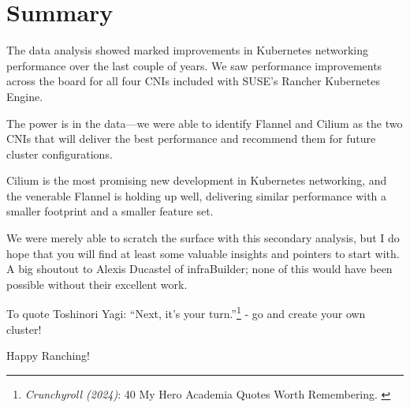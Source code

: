 %
%

\pagebreak
\section{Summary}

\onehalfspacing

The data analysis showed marked improvements in Kubernetes networking performance over the last couple of years. We saw performance improvements across the board for all four CNIs included with SUSE's Rancher Kubernetes Engine.

The power is in the data—we were able to identify Flannel and Cilium as the two CNIs that will deliver the best performance and recommend them for future cluster configurations.

Cilium is the most promising new development in Kubernetes networking, and the venerable Flannel is holding up well, delivering similar performance with a smaller footprint and a smaller feature set.

We were merely able to scratch the surface with this secondary analysis, but I do hope that you will find at least some valuable insights and pointers to start with. A big shoutout to Alexis Ducastel of infraBuilder; none of this would have been possible without their excellent work.

To quote Toshinori Yagi: “Next, it’s your turn.”\footnote{\textit{Crunchyroll (2024)}: 40 My Hero Academia Quotes Worth Remembering. \cite{mhaQuotes}} - go and create your own cluster!

Happy Ranching!
